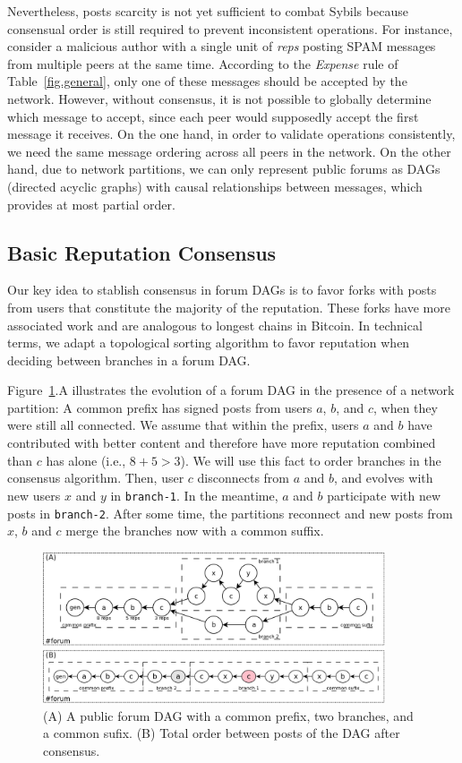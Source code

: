 \documentclass[12pt]{article}
\newcommand{\reps}     {\emph{reps}\xspace}
\newcommand{\code}[1]  {\texttt{\footnotesize{#1}}}
\begin{document}
Nevertheless, posts scarcity is not yet sufficient to combat Sybils because
consensual order is still required to prevent inconsistent operations.
For instance, consider a malicious author with a single unit of \reps posting
SPAM messages from multiple peers at the same time.
According to the \emph{Expense} rule of Table~\ref{fig.general}, only one of
these messages should be accepted by the network.
However, without consensus, it is not possible to globally determine which
message to accept, since each peer would supposedly accept the first message it
receives.
On the one hand, in order to validate operations consistently, we need the same
message ordering across all peers in the network.
On the other hand, due to network partitions, we can only represent public
forums as DAGs (directed acyclic graphs) with causal relationships between
messages, which provides at most partial order.

\subsection{Basic Reputation Consensus}
\label{sec.design.basic}

Our key idea to stablish consensus in forum DAGs is to favor forks with posts
from users that constitute the majority of the reputation.
These forks have more associated work and are analogous to longest chains in
Bitcoin.
%
In technical terms, we adapt a topological sorting algorithm to favor
reputation when deciding between branches in a forum DAG.

Figure~\ref{fig.reps}.A illustrates the evolution of a forum DAG in the
presence of a network partition:
A common prefix has signed posts from users $a$, $b$, and $c$, when they were
still all connected.
%
We assume that within the prefix, users $a$ and $b$ have contributed with
better content and therefore have more reputation combined than $c$ has alone
(i.e., $8+5>3$).
We will use this fact to order branches in the consensus algorithm.
%
Then, user $c$ disconnects from $a$ and $b$, and evolves with new users $x$ and
$y$ in \code{branch-1}.
In the meantime, $a$ and $b$ participate with new posts in \code{branch-2}.
After some time, the partitions reconnect and new posts from $x$, $b$ and $c$
merge the branches now with a common suffix.

\begin{figure}
\centering
\includegraphics[width=0.9\textwidth]{reps.png}
\caption{
    (A) A public forum DAG with a common prefix, two branches, and a common sufix.
    (B) Total order between posts of the DAG after consensus.
}
\label{fig.reps}
\end{figure}
\end{document}
